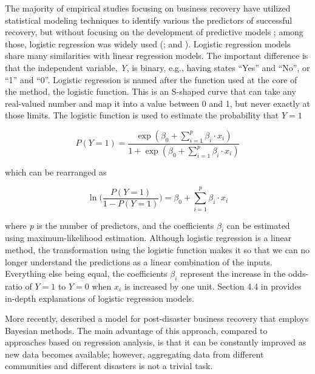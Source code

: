 The majority of empirical studies focusing on business recovery have utilized statistical modeling techniques to identify various the predictors of successful recovery, but without focusing on the development of predictive models \citep{aghababaei2020quantifying}; among those, logistic regression was widely used  (\cite{watson2020importance,marshall2015predicting}; and \cite{dahlhamer1998rebounding}). Logistic regression models share many similarities with linear regression models. The important difference is that the independent variable, \textit{Y}, is binary, e.g., having states ``Yes'' and ``No'', or ``1'' and ``0''. Logistic regression is named after the function used at the core of the method, the logistic function. This is an S-shaped curve that can take any real-valued number and map it into a value between 0 and 1, but never exactly at those limits. The logistic function is used to estimate the probability that $Y=1$

\begin{equation}
    P(Y=1) = \frac{\exp(\beta_0 + \sum_{i=1}^{p}\beta_i \cdot x_i)}{1 + \exp(\beta_0 + \sum_{i=1}^{p}\beta_i \cdot x_i)}
    \label{eq:probability}
\end{equation}

\noindent which can be rearranged as

\begin{equation}
    \ln \Bigg(\frac{P(Y=1)}{1-P(Y=1)}\Bigg) = \beta_0 + \sum_{i=1}^{p}\beta_i \cdot x_i 
    \label{eq:logit}
\end{equation}

\noindent where \textit{p} is the number of predictors, and the coefficients $\beta_i$ can be estimated using maximum-likelihood estimation. Although logistic regression is a linear method, the transformation using the logistic function makes it so that we can no longer understand the predictions as a linear combination of the inputs. Everything else being equal, the coefficients $\beta_i$ represent the increase in the odds-ratio of $Y=1$ to $Y=0$ when $x_i$ is increased by one unit. Section 4.4 in \citet{friedman2001elements} provides in-depth explanations of logistic regression models.\

More recently, \citet{aghababaei2020quantifying} described a model for post-disaster business recovery that employs Bayesian methods. The main advantage of this approach, compared to approaches based on regression analysis, is that it can be constantly improved as new data becomes available; however, aggregating data from different communities and different disasters is not a trivial task.\

